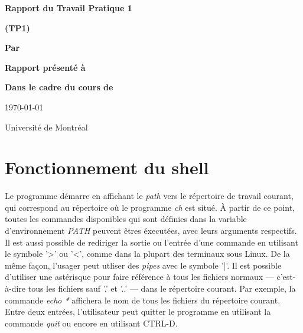 \documentclass[letterpaper,12pt]{scrartcl}
\begin{document}
	\begin{center}
		\vspace{2cm}

		{\Huge\bf\sf Rapport du Travail Pratique 1}

		\vspace{0.5cm}

		{\bf\sf (TP1)}

		\vspace{4cm}

		{\bf\sf Par}

		\vspace{0.5cm}{\large\bf\sf Charles Langlois et François Poitras}

		\vspace{2cm}

		{\bf\sf Rapport présenté à}

		\vspace{0.5cm}{\large\bf\sf M. Stefan Monnier}

		\vspace{2cm}

		{\bf\sf Dans le cadre du cours de}

		\vspace{0.5cm}{\large\bf\sf Systèmes d'exploitation (IFT2245)}

		\vspace{\fill}
		\today

		\vspace{0.5cm}Université de Montréal
	\end{center}
	
	\newpage

	\pagestyle{cb}
	
	\tableofcontents

	\newpage

	\section{Fonctionnement du shell}
			Le programme démarre en affichant le \textit{path} vers le répertoire de travail courant, qui correspond au répertoire où le programme \textit{ch} est situé. À partir de ce point, toutes les commandes disponibles qui sont définies dans la variable d'environnement \textit{PATH} peuvent êtres éxecutées, avec leurs arguments respectifs. Il est aussi possible de rediriger la sortie ou l'entrée d'une commande en utilisant le symbole '>' ou '<', comme dans la plupart des terminaux sous Linux. De la même façon, l'usager peut utliser des \textit{pipes} avec le symbole '|'. Il est possible d'utiliser une astérisque pour faire référence à tous les fichiers normaux --- c'est-à-dire tous les fichiers sauf '.' et '..' --- dans le répertoire courant. Par exemple, la commande \textit{echo *} affichera le nom de tous les fichiers du répertoire courant. Entre deux entrées, l'utilisateur peut quitter le programme en utilisant la commande \textit{quit} ou encore en utilisant CTRL-D.
\end{document}
